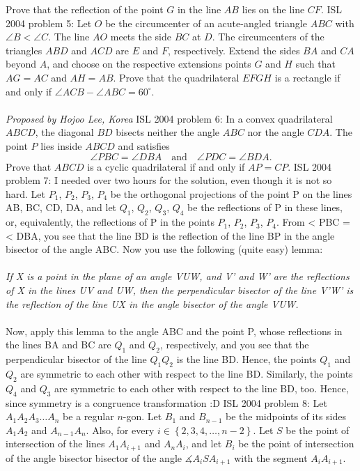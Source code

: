 Prove that the reflection of the point $G$ in the line $AB$ lies on the line $CF$. 
ISL 2004 problem 5:  Let $O$ be the circumcenter of an acute-angled triangle $ABC$ with ${\angle B<\angle C}$. The line $AO$ meets the side $BC$ at $D$. The circumcenters of the triangles $ABD$ and $ACD$ are $E$ and $F$, respectively. Extend the sides $BA$ and $CA$ beyond $A$, and choose on the respective extensions points $G$ and $H$ such that ${AG=AC}$ and ${AH=AB}$. Prove that the quadrilateral $EFGH$ is a rectangle if and only if ${\angle ACB-\angle ABC=60^{\circ }}$. \\\\
\textit{Proposed by Hojoo Lee, Korea} 
ISL 2004 problem 6:  In a convex quadrilateral $ABCD$, the diagonal $BD$ bisects neither the angle $ABC$ nor the angle $CDA$. The point $P$ lies inside $ABCD$ and satisfies
\[ \angle PBC=\angle DBA\quad\text{and}\quad \angle PDC=\angle BDA. \]
Prove that $ABCD$ is a cyclic quadrilateral if and only if $AP=CP$. 
ISL 2004 problem 7:  I needed over two hours for the solution, even though it is not so hard. Let $P_1$, $P_2$, $P_3$, $P_4$ be the orthogonal projections of the point P on the lines AB, BC, CD, DA, and let $Q_1$, $Q_2$, $Q_3$, $Q_4$ be the reflections of P in these lines, or, equivalently, the reflections of P in the points $P_1$, $P_2$, $P_3$, $P_4$. From < PBC = < DBA, you see that the line BD is the reflection of the line BP in the angle bisector of the angle ABC. Now you use the following (quite easy) lemma: \\\\
\textit{If X is a point in the plane of an angle VUW, and V' and W' are the reflections of X in the lines UV and UW, then the perpendicular bisector of the line V'W' is the reflection of the line UX in the angle bisector of the angle VUW.} \\\\
Now, apply this lemma to the angle ABC and the point P, whose reflections in the lines BA and BC are $Q_1$ and $Q_2$, respectively, and you see that the perpendicular bisector of the line $Q_1 Q_2$ is the line BD. Hence, the points $Q_1$ and $Q_2$ are symmetric to each other with respect to the line BD. Similarly, the points $Q_4$ and $Q_3$ are symmetric to each other with respect to the line BD, too. Hence, since symmetry is a congruence transformation  :D 
ISL 2004 problem 8:  Let $A_1A_2A_3\ldots A_n$ be a regular $n$-gon. Let $B_1$ and $B_{n-1}$ be the midpoints of its sides $A_1A_2$ and $A_{n-1}A_n$. Also, for every $i\in\left\{2,3,4,\ldots ,n-2\right\}$. Let $S$ be the point of intersection of the lines $A_1A_{i+1}$ and $A_nA_i$, and let $B_i$ be the point of intersection of the angle bisector bisector of the angle $\measuredangle A_iSA_{i+1}$ with the segment $A_iA_{i+1}$. \\\\
